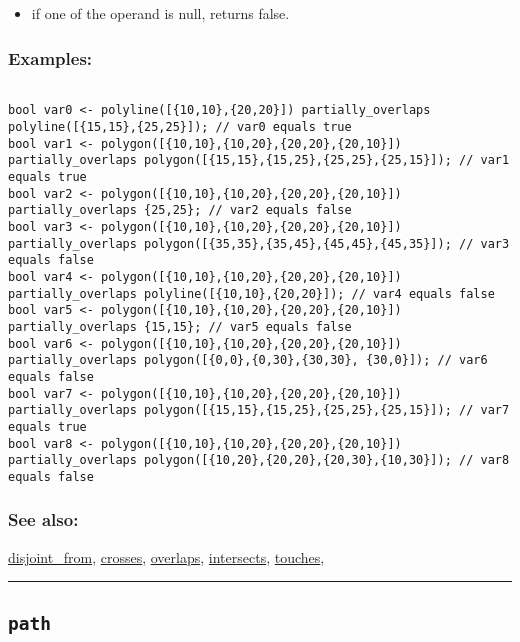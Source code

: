 \documentclass[]{book}
\providecommand{\tightlist}{%
  \setlength{\itemsep}{0pt}\setlength{\parskip}{0pt}}
\theoremstyle{definition}
\theoremstyle{definition}
\theoremstyle{definition}
\theoremstyle{remark}
\begin{document}
\begin{itemize}
\tightlist
\item
  if one of the operand is null, returns false.
\end{itemize}

\subsubsection{Examples:}\label{examples-270}

\begin{verbatim}
 
bool var0 <- polyline([{10,10},{20,20}]) partially_overlaps polyline([{15,15},{25,25}]); // var0 equals true 
bool var1 <- polygon([{10,10},{10,20},{20,20},{20,10}]) partially_overlaps polygon([{15,15},{15,25},{25,25},{25,15}]); // var1 equals true 
bool var2 <- polygon([{10,10},{10,20},{20,20},{20,10}]) partially_overlaps {25,25}; // var2 equals false 
bool var3 <- polygon([{10,10},{10,20},{20,20},{20,10}]) partially_overlaps polygon([{35,35},{35,45},{45,45},{45,35}]); // var3 equals false 
bool var4 <- polygon([{10,10},{10,20},{20,20},{20,10}]) partially_overlaps polyline([{10,10},{20,20}]); // var4 equals false 
bool var5 <- polygon([{10,10},{10,20},{20,20},{20,10}]) partially_overlaps {15,15}; // var5 equals false 
bool var6 <- polygon([{10,10},{10,20},{20,20},{20,10}]) partially_overlaps polygon([{0,0},{0,30},{30,30}, {30,0}]); // var6 equals false 
bool var7 <- polygon([{10,10},{10,20},{20,20},{20,10}]) partially_overlaps polygon([{15,15},{15,25},{25,25},{25,15}]); // var7 equals true 
bool var8 <- polygon([{10,10},{10,20},{20,20},{20,10}]) partially_overlaps polygon([{10,20},{20,20},{20,30},{10,30}]); // var8 equals false
\end{verbatim}

\subsubsection{See also:}\label{see-also-158}

\href{OperatorsDH\#disjoint_from}{disjoint\_from},
\href{OperatorsBC\#crosses}{crosses},
\href{OperatorsNR\#overlaps}{overlaps},
\href{OperatorsIM\#intersects}{intersects},
\href{OperatorsSZ\#touches}{touches},

\begin{center}\rule{0.5\linewidth}{\linethickness}\end{center}

\subsection{\texorpdfstring{\texttt{path}}{path}}\label{path}
\end{document}

